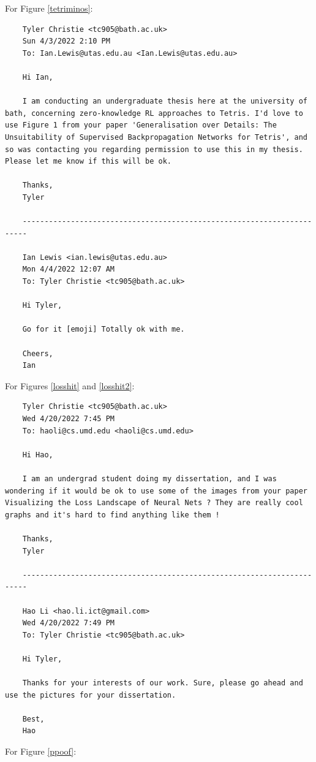 \documentclass[12pt]{article}
\begin{document}
\noindent For Figure \ref{tetriminos}:
\begin{verbatim}
    Tyler Christie <tc905@bath.ac.uk>
    Sun 4/3/2022 2:10 PM
    To: Ian.Lewis@utas.edu.au <Ian.Lewis@utas.edu.au>
    
    Hi Ian,
    
    I am conducting an undergraduate thesis here at the university of bath, concerning zero-knowledge RL approaches to Tetris. I'd love to use Figure 1 from your paper 'Generalisation over Details: The Unsuitability of Supervised Backpropagation Networks for Tetris', and so was contacting you regarding permission to use this in my thesis. Please let me know if this will be ok.
    
    Thanks,
    Tyler

    -----------------------------------------------------------------------

    Ian Lewis <ian.lewis@utas.edu.au>
    Mon 4/4/2022 12:07 AM
    To: Tyler Christie <tc905@bath.ac.uk>

    Hi Tyler,

    Go for it [emoji] Totally ok with me.

    Cheers,
    Ian
\end{verbatim}
\noindent For Figures \ref{losshit} and \ref{losshit2}:
\begin{verbatim}
    Tyler Christie <tc905@bath.ac.uk>
    Wed 4/20/2022 7:45 PM
    To: haoli@cs.umd.edu <haoli@cs.umd.edu>

    Hi Hao,

    I am an undergrad student doing my dissertation, and I was wondering if it would be ok to use some of the images from your paper Visualizing the Loss Landscape of Neural Nets ? They are really cool graphs and it's hard to find anything like them !

    Thanks,
    Tyler

    -----------------------------------------------------------------------

    Hao Li <hao.li.ict@gmail.com>
    Wed 4/20/2022 7:49 PM
    To: Tyler Christie <tc905@bath.ac.uk>

    Hi Tyler,

    Thanks for your interests of our work. Sure, please go ahead and use the pictures for your dissertation. 

    Best,
    Hao
\end{verbatim}
\noindent For Figure \ref{ppoof}:
\end{document}
